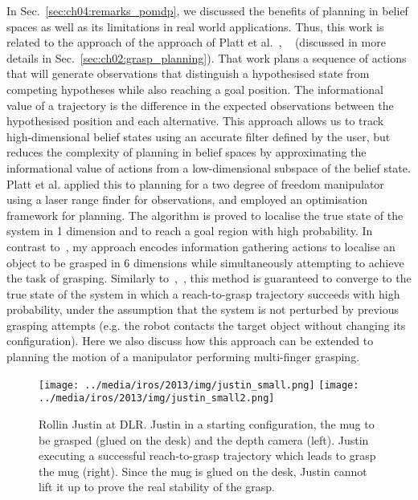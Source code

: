 In Sec.~\ref{sec:ch04:remarks_pomdp}, we discussed the benefits of planning in belief spaces as well as its limitations in real world applications. 
Thus, this work is related to the approach of the approach of Platt et al.~\citep{bib:platt_csail_2011}, ~\citep{bib:platt_icra_2012} (discussed in more details in Sec.~\ref{sec:ch02:grasp_planning}). That work plans a sequence of actions that will generate observations that distinguish a hypothesised state from competing hypotheses while also reaching a goal position. The informational value of a trajectory is the difference in the expected observations between the hypothesised position and each alternative. This approach allows us to track high-dimensional belief states using an accurate filter defined by the user, but reduces the complexity of planning in belief spaces by approximating the informational value of actions from a low-dimensional subspace of the belief state. Platt et al. applied this to planning for a two degree of freedom manipulator using a laser range finder for observations, and employed an optimisation framework for planning. The algorithm is proved to localise the true state of the system in 1 dimension and to reach a goal region with high probability. In contrast to~\citep{bib:platt_csail_2011}, my approach encodes information gathering actions to localise an object to be grasped in 6 dimensions while simultaneously attempting to achieve the task of grasping.  Similarly to~\citep{bib:platt_csail_2011},~\citep{bib:platt_icra_2012}, this method is guaranteed to converge to the true state of the system in which a reach-to-grasp trajectory succeeds with high probability, under the assumption that the system is not perturbed by previous grasping attempts (e.g. the robot contacts the target object without changing its configuration). Here we also discuss how this approach can be extended to planning the motion of a manipulator performing multi-finger grasping. 

\begin{figure}[!t]
\centerline{
\texttt{[image: ../media/iros/2013/img/justin\_small.png]}
\texttt{[image: ../media/iros/2013/img/justin\_small2.png]}
}
\caption[Real scenario]{Rollin Justin at DLR. Justin in a starting configuration, the mug to be grasped (glued on the desk) and the depth camera (left). Justin executing a successful reach-to-grasp trajectory which leads to grasp the mug (right). Since the mug is glued on the desk, Justin cannot lift it up to prove the real stability of the grasp.}
\label{fig:justin}
\end{figure}

